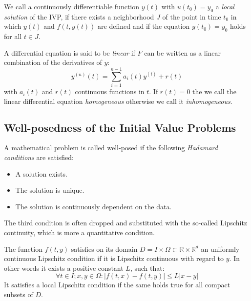 \begin{definition}
	We call a continuously differentiable function $y(t)$ with $u(t_0) = y_0$ a \textit{local solution} of the IVP, if there exists a	neighborhood $J$ of the point in time $t_0$ in which $y(t)$ and $f(t,y(t))$ are defined and if the equation $y(t_0) = y_0$ holds for all $t \in J$.
\end{definition}

\begin{definition}
	A differential equation is said to be \textit{linear} if $F$ can be written as a linear combination of the derivatives of $y$:
	\begin{equation}
		y^{(n)}(t) = \sum_{i=1}^{n-1} a_i(t)y^{(i)}+r(t)
	\end{equation}
	with $a_i(t)$ and $r(t)$ continuous functions in $t$. If $r(t)=0$ the we call the linear differential equation \textit{homogeneous} otherwise we call it \textit{inhomogeneous}.
\end{definition}

\subsection{Well-posedness of the Initial Value Problems}

\begin{definition}
	A mathematical problem is called well-posed if the following \textit{Hadamard conditions} are satisfied:
	\begin{itemize}
		\setlength{\itemsep}{0pt}
		\item A solution exists.
		\item The solution is unique.
		\item The solution is continuously dependent on the data.
	\end{itemize}
	The third condition is often dropped and substituted with the so-called Lipschitz continuity, which is more a quantitative condition.
\end{definition}

\begin{definition}
	The function $f(t,y)$ satisfies on its domain $D = I \times \Omega \subset \mathbb{R} \times \mathbb{R}^d$ an uniformly continuous Lipschitz condition if it is Lipschitz continuous with regard to $y$. In other words it exists a positive constant $L$, such that:
	\begin{equation}
		\forall t\in I; x,y \in \Omega : |f(t,x) - f(t,y)| \leq L |x-y|
	\end{equation}
	It satisfies a local Lipschitz condition if the same holds true for all compact subsets of $D$.
\end{definition}

